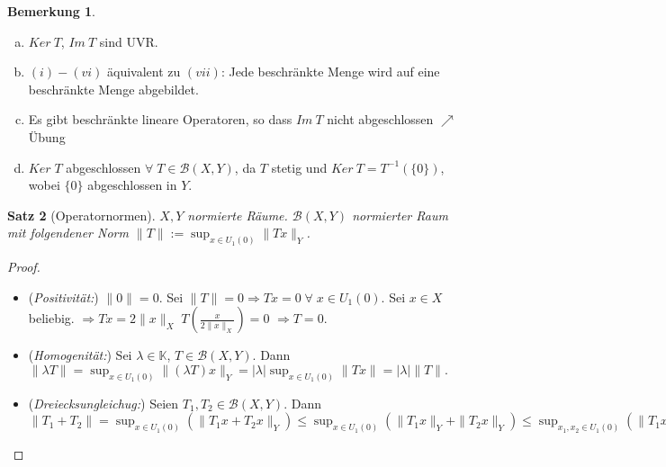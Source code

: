 \documentclass[ngerman]{report}
\theoremstyle{plain}%
\newtheorem{thm}{Satz}[chapter]
\theoremstyle{definition}%
\theoremstyle{myStyle}
\newtheorem{bem}[thm]{Bemerkung}
\newcommand{\K}{\mathbb{K}}
\newcommand{\B}{\mathcal{B}} %
\newcommand{\BS}[1][X,Y]{\mathcal{B}(#1)} %
\newcommand{\norm}[1]{\|#1\|}
\newcommand{\df}[1][]{%
	\overset{#1}{\Rightarrow}
}
\newcommand{\U}[2][1]{U_{#1}(#2)} %
\newcommand{\EK}{\U{0}} %
\newcommand{\inv}[1]{#1^{-1}}
\newcommand{\disp}{\displaystyle}
\begin{document}
	\begin{bem}
		\begin{enumerate}[a)] \addtocounter{enumi}{2}
			\item $Ker\:T$, $Im\:T$ sind UVR. 
			\item $(i) - (vi)$ äquivalent zu $(vii)$:
				Jede beschränkte Menge wird auf eine beschränkte Menge abgebildet.
			\item Es gibt beschränkte lineare Operatoren, so dass $Im\: T$ nicht abgeschlossen $\nearrow$ Übung
			\item $Ker\; T$ abgeschlossen $\forall \; T\in \B(X,Y)$, da $T$ stetig und $Ker\:T = \inv{T}(\{0\})$, wobei $\{0\}$ abgeschlossen in $Y$.
		\end{enumerate}
	\end{bem}						
	\begin{thm}[Operatornormen]
		$X,Y$ normierte Räume. $\BS$ normierter Raum mit folgendener Norm
		 $\norm{T} := \disp \sup_{x \in \EK}\norm{Tx}_Y$.
	\end{thm}
	\begin{proof}
		\begin{itemize}[]
				\item (\textit{Positivität:}) 
					$\norm{0} = 0$. Sei $\norm{T} = 0 \df Tx = 0 \; \forall \; x\in\EK$.
					Sei $x\in X$ beliebig. $\df Tx = 2\norm{x}_X \; T \left(\frac{x}{2\norm{x}_X}\right) = 0$
					$\df T = 0$. 

			\item (\textit{Homogenität:}) Sei $\lambda \in \K$, $T\in \BS$. 
				Dann $\norm{\lambda T} = \sup_{x \in \EK} \norm{ (\lambda T) x}_Y
				= |\lambda| \sup_{x \in \EK} \norm{Tx} = |\lambda| \norm{ T}.$
			
			\item (\textit{Dreiecksungleichug:}) Seien $T_1, T_2 \in\BS$. Dann 
				$\disp \norm{T_1 + T_2} = \sup_{x \in \EK}(\norm{T_1x + T_2x}_Y)
				\leq \sup_{x \in \EK}(\norm{T_1x}_Y + \norm{T_2x}_Y)
				\leq \sup_{x_1,x_2  \in \EK}(\norm{T_1x_1}_Y + \norm{T_2x_2}_Y)
				\leq \sup_{x_1 \in \EK}\norm{T_1x_1}_Y + \sup_{x_2 \in \EK}\norm{T_1x_2}_Y
				= \norm{T_1} + \norm{T_2}$
		\end{itemize}
	\end{proof}
		
\end{document}
